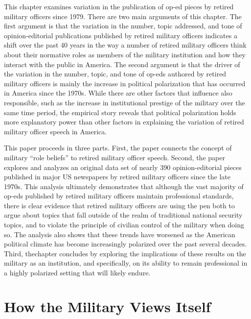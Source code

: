 \documentclass[12pt,]{article}
\begin{document}
This chapter examines variation in the publication of op-ed pieces by retired military officers since 1979. There are two main arguments of this chapter. The first argument is that the variation in the number, topic addressed, and tone of opinion-editorial publications published by retired military officers indicates a shift over the past 40 years in the way a number of retired military officers think about their normative roles as members of the military institution and how they interact with the public in America. The second argument is that the driver of the variation in the number, topic, and tone of op-eds authored by retired military officers is mainly the increase in political polarization that has occurred in America since the 1970s. While there are other factors that influence also responsible, such as the increase in institutional prestige of the military over the same time period, the empirical story reveals that political polarization holds more explanatory power than other factors in explaining the variation of retired military officer speech in America.

This paper proceeds in three parts. First, the paper connects the concept of military ``role beliefs'' to retired military officer speech. Second, the paper explores and analyzes an original data set of nearly 390 opinion-editorial pieces published in major US newspapers by retired military officers since the late 1970s. This analysis ultimately demonstrates that although the vast majority of op-eds published by retired military officers maintain professional standards, there is clear evidence that retired military officers are using the pen both to argue about topics that fall outside of the realm of traditional national security topics, and to violate the principle of civilian control of the military when doing so. The analysis also shows that these trends have worsened as the American political climate has become increasingly polarized over the past several decades. Third, thechapter concludes by exploring the implications of these results on the military as an institution, and specifically, on its ability to remain professional in a highly polarized setting that will likely endure.

\singlespace

\hypertarget{how-the-military-views-itself}{%
\section{How the Military Views Itself}\label{how-the-military-views-itself}}
\end{document}
